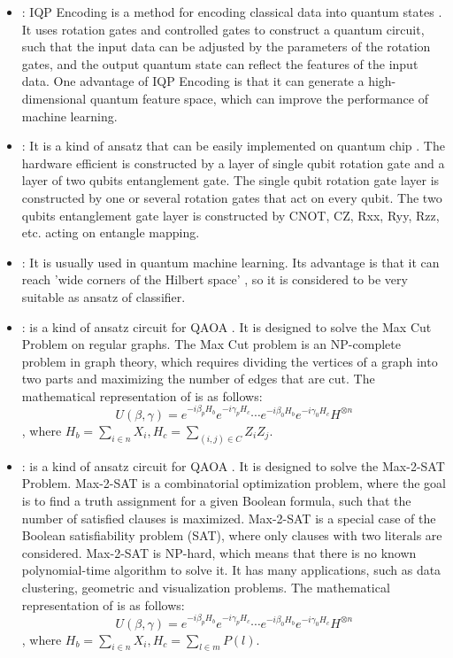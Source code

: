 \begin{itemize}
    \item \IQPEncoding: IQP Encoding is a method for encoding classical data into quantum states \cite{Havlíček2019}. It uses rotation gates and controlled gates to construct a quantum circuit, such that the input data can be adjusted by the parameters of the rotation gates, and the output quantum state can reflect the features of the input data. One advantage of IQP Encoding is that it can generate a high-dimensional quantum feature space, which can improve the performance of machine learning.

    \item \HardwareEfficientAnsatz: It is a kind of ansatz that can be easily implemented on quantum chip \cite{Kandala2017}. The hardware efficient is constructed by a layer of single qubit rotation gate and a layer of two qubits entanglement gate. The single qubit rotation gate layer is constructed by one or several rotation gates that act on every qubit. The two qubits entanglement gate layer is constructed by CNOT, CZ, Rxx, Ryy, Rzz, etc. acting on entangle mapping.

    \item \StronglyEntangling: It is usually used in quantum machine learning. Its advantage is that it can reach 'wide corners of the Hilbert space' \cite{Schuld_2020}, so it is considered to be very suitable as ansatz of classifier.

    \item \MaxCutAnsatz: \MaxCutAnsatz is a kind of ansatz circuit for QAOA \cite{farhi2014quantum}. It is designed to solve the Max Cut Problem on regular graphs. The Max Cut problem is an NP-complete problem in graph theory, which requires dividing the vertices of a graph into two parts and maximizing the number of edges that are cut. The mathematical representation of \MaxCutAnsatz is as follows:
          $$U(\beta, \gamma) = e^{-i\beta_pH_b}e^{-i\gamma_pH_c}
              \cdots e^{-i\beta_0H_b}e^{-i\gamma_0H_c}H^{\otimes n}$$,
          where $H_b = \sum_{i\in n}X_{i}, H_c = \sum_{(i,j)\in C}Z_iZ_j$.

    \item \MaxToSATAnsatz: \MaxToSATAnsatz is a kind of ansatz circuit for QAOA \cite{Akshay_2020}. It is designed to solve the Max-2-SAT Problem. Max-2-SAT is a combinatorial optimization problem, where the goal is to find a truth assignment for a given Boolean formula, such that the number of satisfied clauses is maximized. Max-2-SAT is a special case of the Boolean satisfiability problem (SAT), where only clauses with two literals are considered. Max-2-SAT is NP-hard, which means that there is no known polynomial-time algorithm to solve it. It has many applications, such as data clustering, geometric and visualization problems. The mathematical representation of \MaxToSATAnsatz is as follows:
          $$U(\beta, \gamma) = e^{-i\beta_pH_b}e^{-i\gamma_pH_c}
              \cdots e^{-i\beta_0H_b}e^{-i\gamma_0H_c}H^{\otimes n}$$,
          where $H_b = \sum_{i\in n}X_{i}, H_c = \sum_{l\in m}P(l)$.


\end{itemize}
